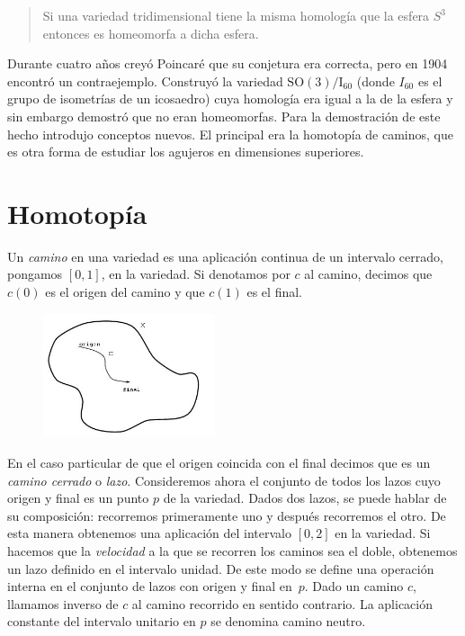 \documentclass[a4paper, 12pt]{article}
\begin{document}
\begin{quote} \it

Si una variedad tridimensional tiene la misma homología que la esfera $S^3$ entonces es homeomorfa a  dicha esfera.

\end{quote}

Durante cuatro años creyó Poincaré que su conjetura era correcta, pero en 1904 encontró un contraejemplo. Construyó la variedad $\mathrm{SO}(3)/\mathrm{I}_{60}$ (donde $I_{60}$ es el grupo de isometrías de un icosaedro) cuya homología era igual a la de la esfera y sin embargo demostró que no eran homeomorfas.  Para la demostración de este hecho introdujo conceptos nuevos.  El principal era la homotopía de caminos, que es otra forma de estudiar los agujeros en dimensiones superiores.


\newpage

\section*{Homotopía}

Un {\it camino} en una variedad es una aplicación continua de un intervalo cerrado, pongamos $[0,1]$, en la variedad. Si denotamos por $c$ al camino, decimos que $c(0)$ es el origen del camino y que $c(1)$ es el final. 

\begin{figure}[htbp]
	\centering
		\includegraphics[width=0.45\textwidth]{imagenes/camino.jpg}

	\label{fig:camino}
\end{figure}


 En el caso particular de que el origen coincida con el final decimos que es un {\it camino cerrado} o {\it lazo}.  Consideremos ahora el conjunto de todos los lazos cuyo origen y final es un punto $p$ de la variedad.  Dados dos lazos, se puede hablar de su composición: recorremos primeramente uno y después recorremos el otro.  De esta manera obtenemos una aplicación del intervalo $[0,2]$ en la variedad.  Si hacemos que la {\it velocidad} a la que se recorren los caminos sea el doble, obtenemos un lazo definido en el intervalo unidad.  De este modo se define una operación interna en el conjunto de lazos con origen y final en~$p$.  Dado un camino $c$, llamamos inverso de $c$ al camino recorrido en sentido contrario.  La aplicación constante del intervalo unitario en $p$ se denomina camino neutro. 
\end{document}
